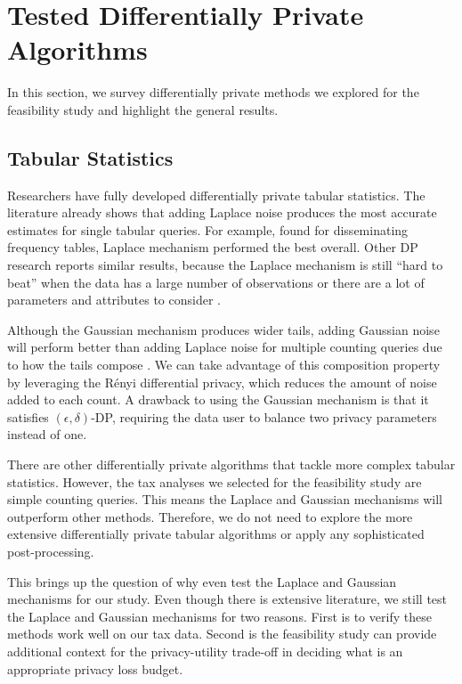 \section{Tested Differentially Private Algorithms}\label{sec:dp-mech}
In this section, we survey differentially private methods we explored for the feasibility study and highlight the general results.

\subsection{Tabular Statistics}
Researchers have fully developed differentially private tabular statistics. The literature already shows that adding Laplace noise produces the most accurate estimates for single tabular queries. For example, \cite{rinott2018confidentiality} found for disseminating frequency tables, Laplace mechanism performed the best overall. Other DP research reports similar results, because the Laplace mechanism is still ``hard to beat'' when the data has a large number of observations or there are a lot of parameters and attributes to consider \autocite{bowen2021differentially,shlomo2018statistical,liu2018generalized}.

Although the Gaussian mechanism produces wider tails, adding Gaussian noise will perform better than adding Laplace noise for multiple counting queries due to how the tails compose \cite{wang2019subsampled}. We can take advantage of this composition property by leveraging the R\'enyi differential privacy, which reduces the amount of noise added to each count. A drawback to using the Gaussian mechanism is that it satisfies $(\epsilon,\delta)$-DP, requiring the data user to balance two privacy parameters instead of one.

There are other differentially private algorithms that tackle more complex tabular statistics. However, the tax analyses we selected for the feasibility study are simple counting queries. This means the Laplace and Gaussian mechanisms will outperform other methods. Therefore, we do not need to explore the more extensive differentially private tabular algorithms or apply any sophisticated post-processing.

This brings up the question of why even test the Laplace and Gaussian mechanisms for our study. Even though there is extensive literature, we still test the Laplace and Gaussian mechanisms for two reasons. First is to verify these methods work well on our tax data. Second is the feasibility study can provide additional context for the privacy-utility trade-off in deciding what is an appropriate privacy loss budget.

